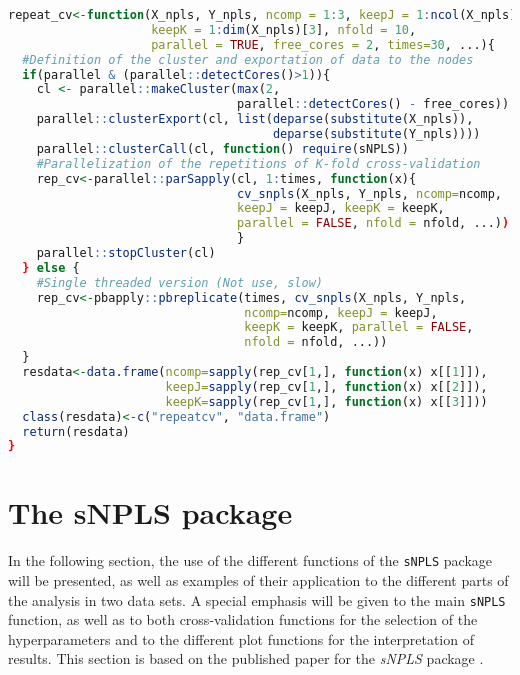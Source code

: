 \vspace{12pt}
\begin{lstlisting}[language=R, deletekeywords={scale, !=, <-, !, Q, qf, names, max, var, drop, se, search.grid, mean, grid, search, rep, repeat}, otherkeywords={}, morekeywords={unfold3w, pbreplicate, parSapply}, caption=Repeated cross validation function]
repeat_cv<-function(X_npls, Y_npls, ncomp = 1:3, keepJ = 1:ncol(X_npls), 
                    keepK = 1:dim(X_npls)[3], nfold = 10, 
                    parallel = TRUE, free_cores = 2, times=30, ...){
  #Definition of the cluster and exportation of data to the nodes
  if(parallel & (parallel::detectCores()>1)){
    cl <- parallel::makeCluster(max(2, 
                                parallel::detectCores() - free_cores))
    parallel::clusterExport(cl, list(deparse(substitute(X_npls)), 
                                     deparse(substitute(Y_npls))))
    parallel::clusterCall(cl, function() require(sNPLS))
    #Parallelization of the repetitions of K-fold cross-validation
    rep_cv<-parallel::parSapply(cl, 1:times, function(x){
                                cv_snpls(X_npls, Y_npls, ncomp=ncomp, 
                                keepJ = keepJ, keepK = keepK, 
                                parallel = FALSE, nfold = nfold, ...))
                                }
    parallel::stopCluster(cl)
  } else {
    #Single threaded version (Not use, slow)
    rep_cv<-pbapply::pbreplicate(times, cv_snpls(X_npls, Y_npls, 
                                 ncomp=ncomp, keepJ = keepJ, 
                                 keepK = keepK, parallel = FALSE, 
                                 nfold = nfold, ...))
  }
  resdata<-data.frame(ncomp=sapply(rep_cv[1,], function(x) x[[1]]), 
                      keepJ=sapply(rep_cv[1,], function(x) x[[2]]),
                      keepK=sapply(rep_cv[1,], function(x) x[[3]]))
  class(resdata)<-c("repeatcv", "data.frame")
  return(resdata)
}
\end{lstlisting}

\section{The sNPLS package}
In the following section, the use of the different functions of the \texttt{sNPLS} package will be presented, as well as examples of their application to the different parts of the analysis in two data sets. A special emphasis will be given to the main \texttt{sNPLS} function, as well as to both cross-validation functions for the selection of the hyperparameters and to the different plot functions for the interpretation of results. This section is based on the published paper for the \textit{sNPLS} package \parencite{hervas2018sparse}.

